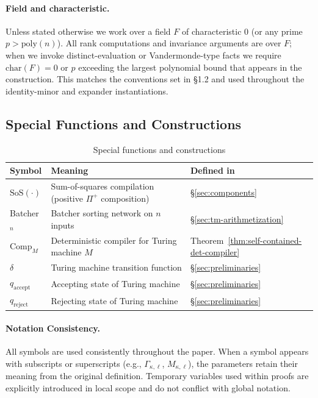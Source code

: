 \documentclass[12pt]{article}
\theoremstyle{definition}
\theoremstyle{definition}
\theoremstyle{remark}
\theoremstyle{remark}
\begin{document}
\paragraph{Field and characteristic.}
Unless stated otherwise we work over a field $F$ of characteristic 0 (or any prime $p > \mathrm{poly}(n)$). All rank computations and invariance arguments are over $F$; when we invoke distinct-evaluation or Vandermonde-type facts we require $\mathrm{char}(F) = 0$ or $p$ exceeding the largest polynomial bound that appears in the construction. This matches the conventions set in \S1.2 and used throughout the identity-minor and expander instantiations.

\subsection{Special Functions and Constructions}

\begin{table}[h]
\centering
\begin{tabular}{lp{6cm}l}
\hline
\textbf{Symbol} & \textbf{Meaning} & \textbf{Defined in} \\
\hline
$\mathrm{SoS}(\cdot)$ & Sum-of-squares compilation (positive $\Pi^+$ composition) & \S\ref{sec:components} \\
Batcher$_n$ & Batcher sorting network on $n$ inputs & \S\ref{sec:tm-arithmetization} \\
$\mathrm{Comp}_M$ & Deterministic compiler for Turing machine $M$ & Theorem~\ref{thm:self-contained-det-compiler} \\
$\delta$ & Turing machine transition function & \S\ref{sec:preliminaries} \\
$q_{\mathrm{accept}}$ & Accepting state of Turing machine & \S\ref{sec:preliminaries} \\
$q_{\mathrm{reject}}$ & Rejecting state of Turing machine & \S\ref{sec:preliminaries} \\
\hline
\end{tabular}
\caption{Special functions and constructions}
\label{tab:special-notation}
\end{table}

\paragraph{Notation Consistency.}
All symbols are used consistently throughout the paper. When a symbol appears with subscripts or superscripts (e.g., $\Gamma_{\kappa,\ell}$, $M_{\kappa,\ell}$), the parameters retain their meaning from the original definition. Temporary variables used within proofs are explicitly introduced in local scope and do not conflict with global notation.
\end{document}

